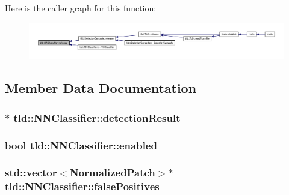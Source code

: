Here is the caller graph for this function:
\nopagebreak
\begin{figure}[H]
\begin{center}
\leavevmode
\includegraphics[width=400pt]{classtld_1_1_n_n_classifier_aabb548e7b9535ad8040fe65d344b3142_icgraph}
\end{center}
\end{figure}




\subsection{Member Data Documentation}
\hypertarget{classtld_1_1_n_n_classifier_a5320e517bb5ad4ed524701df5cc200aa}{
\subsubsection[{detectionResult}]{$\ast$ {\bf tld::NNClassifier::detectionResult}}}
\label{classtld_1_1_n_n_classifier_a5320e517bb5ad4ed524701df5cc200aa}
\hypertarget{classtld_1_1_n_n_classifier_a7a86c7c4d1bf5664540f476f455dad21}{
\subsubsection[{enabled}]{\setlength{\rightskip}{0pt plus 5cm}bool {\bf tld::NNClassifier::enabled}}}
\label{classtld_1_1_n_n_classifier_a7a86c7c4d1bf5664540f476f455dad21}
\hypertarget{classtld_1_1_n_n_classifier_abc088471e8f9e259cc07cbb9a704fb28}{
\subsubsection[{falsePositives}]{\setlength{\rightskip}{0pt plus 5cm}std::vector$<${\bf NormalizedPatch}$>$$\ast$ {\bf tld::NNClassifier::falsePositives}}}
